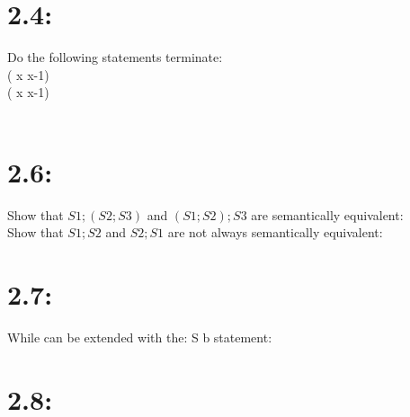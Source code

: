 \documentclass[a0paper, landscape]{paper}
\begin{document}
\section*{2.4:}
Do the following statements terminate:\\
 ( {\cass x x-1}) \\

 ( {\cass x x-1}) \\

  \cskip \\

\section*{2.6:}
Show that $S1;(S2;S3)$ and $(S1;S2);S3$ are semantically equivalent: \\

Show that $S1;S2$ and $S2;S1$ are not always semantically equivalent:



\section*{2.7:}
While can be extended with the:
 \crepeat S b statement:

\section*{2.8:}
\end{document}
